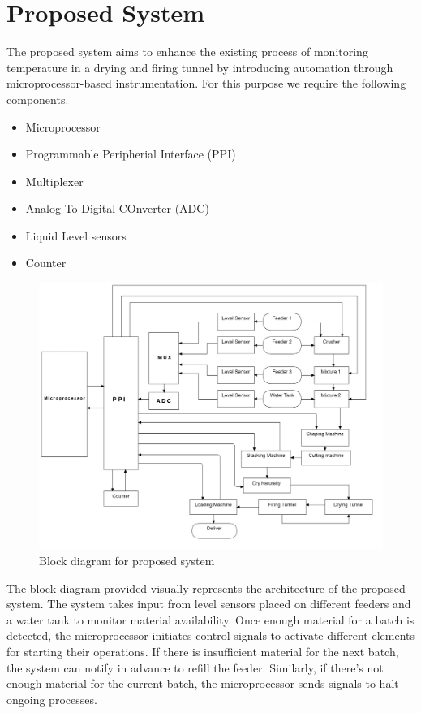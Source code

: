 \section{Proposed System}
\vspace{1em}  
The proposed system aims to enhance the existing process of monitoring temperature in a drying and firing tunnel by introducing automation through microprocessor-based instrumentation. For this purpose we require the following components.
\begin{itemize}
    \item Microprocessor
    \item Programmable Peripherial Interface (PPI) 
    \item Multiplexer
    \item Analog To Digital COnverter (ADC)
    \item Liquid Level sensors
    \item Counter
\end{itemize}
\vspace{1em}
\begin{figure}[h]
    \centering
    \includegraphics[width=1\textwidth]{img/fc.jpg}
    \caption{Block diagram for proposed system}
\end{figure}
\vspace{3em}
The block diagram provided visually represents the architecture of the proposed system. The system takes input from level sensors placed on different feeders and a water tank to monitor material availability. Once enough material for a batch is detected, the microprocessor initiates control signals to activate different elements for starting their operations. If there is insufficient material for the next batch, the system can notify in advance to refill the feeder. Similarly, if there's not enough material for the current batch, the microprocessor sends signals to halt ongoing processes.

